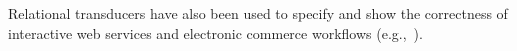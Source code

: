 
Relational transducers have also been used to specify and show the correctness
of interactive web services and electronic commerce workflows
(e.g.,~\cite{trans-ecommerce,deutsch-icdt,deutsch-web-app}).

